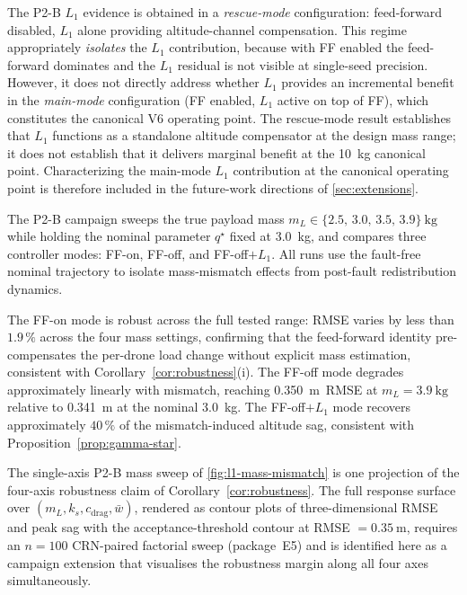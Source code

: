 \begin{remark}
\label{rem:l1-rescue}
  The P2-B $L_1$ evidence is obtained in a \emph{rescue-mode} configuration: feed-forward disabled, $L_1$ alone providing altitude-channel compensation. This regime appropriately \emph{isolates} the $L_1$ contribution, because with FF enabled the feed-forward dominates and the $L_1$ residual is not visible at single-seed precision. However, it does not directly address whether $L_1$ provides an incremental benefit in the \emph{main-mode} configuration (FF enabled, $L_1$ active on top of FF), which constitutes the canonical V6 operating point. The rescue-mode result establishes that $L_1$ functions as a standalone altitude compensator at the design mass range; it does not establish that it delivers marginal benefit at the \SI{10}{\kilo\gram} canonical point. Characterizing the main-mode $L_1$ contribution at the canonical operating point is therefore included in the future-work directions of \cref{sec:extensions}.
\end{remark}

The P2-B campaign sweeps the true payload mass $m_L \in \{2.5,\,3.0,\,3.5,\,3.9\}~\si{\kilo\gram}$ while holding the nominal parameter $q^\star$ fixed at \SI{3.0}{\kilo\gram}, and compares three controller modes: FF-on, FF-off, and FF-off$+L_1$. All runs use the fault-free nominal trajectory to isolate mass-mismatch effects from post-fault redistribution dynamics.

The FF-on mode is robust across the full tested range: RMSE varies by less than $1.9\,\%$ across the four mass settings, confirming that the feed-forward identity pre-compensates the per-drone load change without explicit mass estimation, consistent with Corollary~\ref{cor:robustness}(i). The FF-off mode degrades approximately linearly with mismatch, reaching \SI{0.350}{\metre}~RMSE at $m_L = \SI{3.9}{\kilo\gram}$ relative to \SI{0.341}{\metre} at the nominal \SI{3.0}{\kilo\gram}. The FF-off$+L_1$ mode recovers approximately $40\,\%$ of the mismatch-induced altitude sag, consistent with Proposition~\ref{prop:gamma-star}.

The single-axis P2-B mass sweep of \cref{fig:l1-mass-mismatch} is one projection of the four-axis robustness claim of Corollary~\ref{cor:robustness}. The full response surface over $(m_L, k_s, c_{\mathrm{drag}}, \bar{w})$, rendered as contour plots of three-dimensional RMSE and peak sag with the acceptance-threshold contour at RMSE $=\SI{0.35}{\metre}$, requires an $n=100$ CRN-paired factorial sweep (package~E5) and is identified here as a campaign extension that visualises the robustness margin along all four axes simultaneously.

